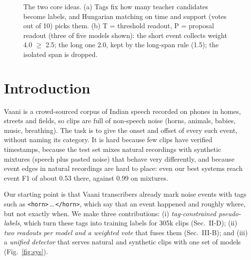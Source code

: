 \documentclass[conference]{IEEEtran}
\begin{document}
\begin{figure}[t]
\begin{minipage}[t]{0.49\textwidth}
\end{minipage}
\caption{The two core ideas. (a) Tags fix how many teacher candidates become labels, and Hungarian matching on time and support (votes out of 10) picks them. (b) T = threshold readout, P = proposal readout (three of five models shown): the short event collects weight 4.0 $\geq$ 2.5; the long one 2.0, kept by the long-span rule (1.5); the isolated span is dropped.}
\label{fig:novel}
\end{figure}

\section{Introduction}
Vaani is a crowd-sourced corpus of Indian speech recorded on phones in homes, streets and fields, so clips are full of non-speech noise (horns, animals, babies, music, breathing).
The task is to give the onset and offset of every such event, without naming its category.
It is hard because few clips have verified timestamps, because the test set mixes natural recordings with synthetic mixtures (speech plus pasted noise) that behave very differently, and because event edges in natural recordings are hard to place: even our best systems reach event F1 of about 0.53 there, against 0.99 on mixtures.

Our starting point is that Vaani transcribers already mark noise events with tags such as \texttt{<horn>}\,\dots\,\texttt{</horn>}, which say that an event happened and roughly where, but not exactly when.
We make three contributions: (i) \emph{tag-constrained pseudo-labels}, which turn these tags into training labels for 305k clips (Sec.~II-D); (ii) \emph{two readouts per model and a weighted vote} that fuses them (Sec.~III-B); and (iii) a \emph{unified detector} that serves natural and synthetic clips with one set of models (Fig.~\ref{fig:sys}).
\end{document}
